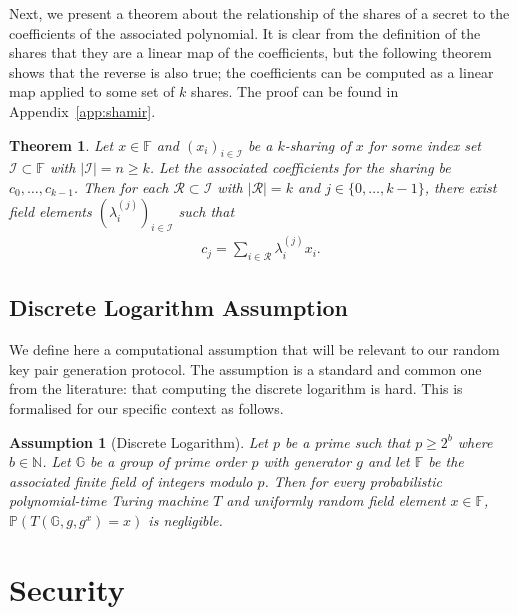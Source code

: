 \documentclass{article}
\newtheorem{theorem}{Theorem}
\newtheorem{assumption}{Assumption}
\theoremstyle{remark}
\newcommand{\N}{\mathbb{N}}
\newcommand{\F}{\mathbb{F}}
\newcommand{\G}{\mathbb{G}}
\renewcommand{\P}{\mathbb{P}}
\begin{document}
Next, we present a theorem about the relationship of the shares of a secret to
the coefficients of the associated polynomial. It is clear from the definition
of the shares that they are a linear map of the coefficients, but the following
theorem shows that the reverse is also true; the coefficients can be computed
as a linear map applied to some set of $k$ shares. The proof can be found in
Appendix~\ref{app:shamir}.

\begin{theorem}\label{thm:shareCoeffLO}
	Let $x \in \F$ and ${(x_i)}_{i \in \mathcal{I}}$ be a $k$-sharing of $x$
	for some index set $\mathcal{I} \subset \F$ with $|\mathcal{I}| = n \ge k$.
	Let the associated coefficients for the sharing be $c_0, \ldots, c_{k-1}$.
	Then for each $\mathcal{R} \subset \mathcal{I}$ with $|\mathcal{R}| = k$
	and $j \in \{0, \ldots, k-1\}$, there exist field elements
	${(\lambda_i^{(j)})}_{i \in \mathcal{I}}$ such that
	\begin{align*}
		c_j = \sum_{i \in \mathcal{R}} \lambda_i^{(j)} x_i.
	\end{align*}
\end{theorem}

\subsection{Discrete Logarithm Assumption}

We define here a computational assumption that will be relevant to our random
key pair generation protocol. The assumption is a standard and common one from
the literature: that computing the discrete logarithm is hard. This is
formalised for our specific context as follows.

\begin{assumption}[Discrete Logarithm]\label{ass:dlog}
	Let $p$ be a prime such that $p \ge 2^b$ where $b \in \N$. Let $\G$ be a
	group of prime order $p$ with generator $g$ and let $\F$ be the associated
	finite field of integers modulo $p$. Then for every probabilistic
	polynomial-time Turing machine $T$ and uniformly random field element $x
	\in \F$, $\P(T(\mathbb{G}, g, g^x) = x)$ is negligible.
\end{assumption}

\section{Security}

\newcommand{\exec}[4]{\textup{\texttt{EXEC}}_{#1, #2} (#3, #4)}
\newcommand{\execD}{\exec{\proto}{\mathcal{A}}{x}{z}}
\end{document}
